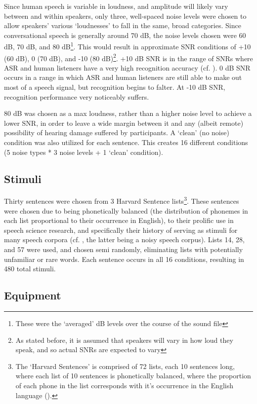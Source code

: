 \documentclass[dissertation,copyright]{uathesis}
\begin{document}
Since human speech is variable in loudness, and amplitude will likely vary between and within speakers, only three, well-spaced noise levels were chosen to allow speakers' various `loudnesses' to fall in the same, broad categories.  Since conversational speech is generally around 70 dB, the noise levels chosen were 60 dB, 70 dB, and 80 dB\footnote{These were the `averaged' dB levels over the course of the sound file}. This would result in approximate SNR conditions of +10 (60 dB), 0 (70 dB), and -10 (80 dB)\footnote{As stated before, it is assumed that speakers will vary in how loud they speak, and so actual SNRs are expected to vary}.  +10 dB SNR is in the range of SNRs where ASR and human listeners have a very high recognition accuracy (cf. \cite{braun:16,gilbert:13}).  0 dB SNR occurs in a range in which ASR and human listeners are still able to make out most of a speech signal, but recognition begins to falter.  At -10 dB SNR, recognition performance very noticeably suffers.

80 dB was chosen as a max loudness, rather than a higher noise level to achieve a lower SNR, in order to leave a wide margin between it and any (albeit remote) possibility of hearing damage suffered by participants.  A `clean' (no noise) condition was also utilized for each sentence.  This creates 16 different conditions (5 noise types * 3 noise levels + 1 `clean' condition).  

\subsection{Stimuli}
Thirty sentences were chosen from 3 Harvard Sentence lists\footnote{The `Harvard Sentences' is comprised of 72 lists, each 10 sentences long, where each list of 10 sentences is phonetically balanced, where the proportion of each phone in the list corresponds with it's occurrence in the English language (\cite{harvardSents}).}.  These sentences were chosen due to being phonetically balanced (the distribution of phonemes in each list proportional to their occurrence in English), to their prolific use in speech science research, and specifically their history of serving as stimuli for many speech corpora (cf. \cite{kabal:02,hu:07}, the latter being a noisy speech corpus).  Lists 14, 28, and 57 were used, and chosen semi randomly, eliminating lists with potentially unfamiliar or rare words.  Each sentence occurs in all 16 conditions, resulting in 480 total stimuli.

  
\subsection{Equipment}
\end{document}
